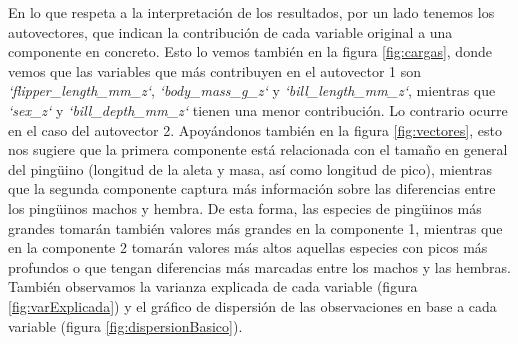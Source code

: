 \documentclass[a4paper,onecolumn]{extarticle}
\begin{document}
\begin{sloppypar}
En lo que respeta a la interpretación de los resultados, por un lado tenemos los autovectores, que indican la contribución de cada variable original a una 
componente en concreto. Esto lo vemos también en la figura \ref{fig:cargas}, donde vemos que las variables que más contribuyen en el autovector 1 son 
\textit{`flipper\_length\_mm\_z`}, \textit{`body\_mass\_g\_z`} y \textit{`bill\_length\_mm\_z`}, mientras que \textit{`sex\_z`} y
\textit{`bill\_depth\_mm\_z`} tienen una menor contribución. Lo contrario ocurre en el caso del autovector 2. Apoyándonos también en la figura 
\ref{fig:vectores}, esto nos sugiere que la primera componente está relacionada con el tamaño en general del pingüino (longitud de la aleta y masa, así como 
longitud de pico), mientras que la segunda componente captura más información sobre las diferencias entre los pingüinos machos y hembra. De esta forma, las 
especies de pingüinos más grandes tomarán también valores más grandes en la componente 1, mientras que en la componente 2 tomarán valores más altos aquellas 
especies con picos más profundos o que tengan diferencias más marcadas entre los machos y las hembras. También observamos la varianza explicada de cada 
variable (figura \ref{fig:varExplicada}) y el gráfico de dispersión de las observaciones en base a cada variable (figura \ref{fig:dispersionBasico}).


\end{sloppypar}
\end{document}
